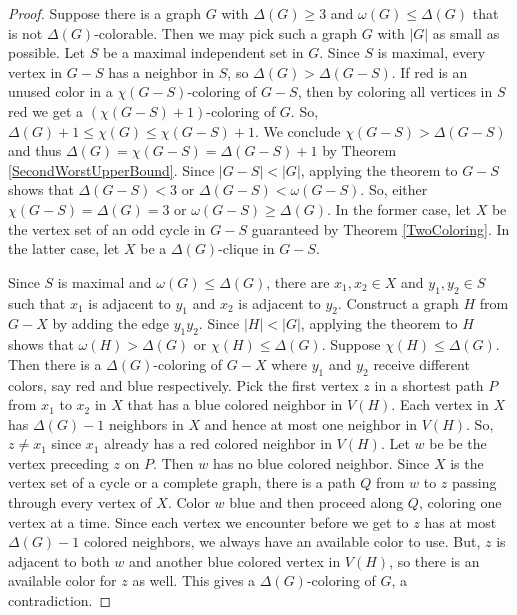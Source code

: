 \documentclass[openany]{tufte-book} %
\theoremstyle{plain}
\newcommand{\card}[1]{\left|#1\right|}
\newcommand{\parens}[1]{\left( #1 \right)}
\begin{document}
\begin{proof}
Suppose there is a graph $G$  with $\Delta(G) \ge 3$ and $\omega(G) \le \Delta(G)$ that is not $\Delta(G)$-colorable.  
Then we may pick such a graph $G$ with $\card{G}$ as small as possible.  Let $S$ be 
a maximal independent set in $G$.  Since $S$ is maximal, every vertex in $G-S$ has a neighbor in $S$, so $\Delta(G) > \Delta(G-S)$.
If red is an unused color in a $\chi(G-S)$-coloring of $G-S$, then by coloring all vertices in $S$ red we get a $\parens{\chi(G-S)+1}$-coloring of $G$.  
So, $\Delta(G) + 1 \le \chi(G) \le \chi(G-S) + 1$. We conclude $\chi(G-S) > \Delta(G - S)$ and thus $\Delta(G) = \chi(G-S) = \Delta(G-S) + 1$ by Theorem \ref{SecondWorstUpperBound}.
Since $\card{G-S} < \card{G}$, applying the theorem to $G-S$ shows that $\Delta(G-S) < 3$ or $\Delta(G -S) < \omega(G - S)$.  
So, either $\chi(G-S) = \Delta(G) = 3$ or $\omega(G-S) \ge \Delta(G)$.  In the former case, let $X$ be the vertex set of an odd cycle in $G-S$ guaranteed by Theorem \ref{TwoColoring}.  
In the latter case, let $X$ be a $\Delta(G)$-clique in $G-S$.

Since $S$ is maximal and $\omega(G) \le \Delta(G)$, there are $x_1, x_2 \in X$ and $y_1, y_2 \in S$ such that $x_1$ is adjacent to $y_1$ and $x_2$ is adjacent to $y_2$.
Construct a graph $H$ from $G-X$ by adding the edge $y_1y_2$.  Since $\card{H} < \card{G}$, applying the theorem to $H$ shows that $\omega(H) > \Delta(G)$ or $\chi(H) \le \Delta(G)$.
Suppose $\chi(H) \le \Delta(G)$.  Then there is a $\Delta(G)$-coloring of $G-X$ where $y_1$ and $y_2$ receive different colors, say red and blue respectively.
Pick the first vertex $z$ in a shortest path $P$ from $x_1$ to $x_2$ in $X$ that has a blue colored neighbor in $V(H)$. 
Each vertex in $X$ has $\Delta(G)-1$ neighbors in $X$ and hence at most one neighbor in $V(H)$.  So, $z \ne x_1$ since $x_1$ already has a red colored neighbor in $V(H)$.
Let $w$ be be the vertex preceding $z$ on $P$. Then $w$ has no blue colored neighbor.  Since $X$ is the vertex set of a cycle or a 
complete graph, there is a path $Q$ from $w$ to $z$ passing through every vertex of $X$.  Color $w$ blue and then proceed along $Q$, coloring one vertex at a time.  
Since each vertex we encounter before we get to $z$ has at most $\Delta(G) - 1$ colored neighbors, we always have an available color to use.  But, $z$ is adjacent
to both $w$ and another blue colored vertex in $V(H)$, so there is an available color for $z$ as well.  This gives a $\Delta(G)$-coloring of $G$, a contradiction.


\end{proof}
\end{document}
